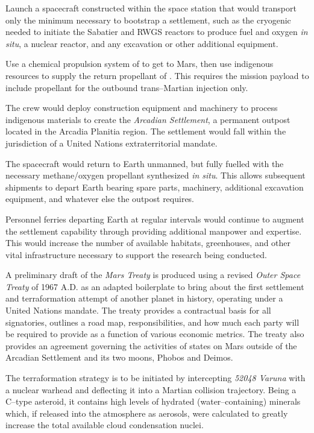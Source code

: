 \item Launch a spacecraft constructed within the space station that would transport only the minimum necessary to bootstrap a settlement, such as the cryogenic  needed to initiate the Sabatier and RWGS reactors to produce fuel and oxygen {\it in situ}, a nuclear reactor, and any excavation or other additional equipment.

\item Use a chemical propulsion system of  to get to Mars, then use indigenous resources to supply the return propellant of . This requires the mission payload to include propellant for the outbound trans--Martian injection only.

\item The crew would deploy construction equipment and machinery to process indigenous materials to create the {\it Arcadian Settlement}, a permanent outpost located in the Arcadia Planitia region. The settlement would fall within the jurisdiction of a United Nations extraterritorial mandate.

\item The spacecraft would return to Earth unmanned, but fully fuelled with the necessary methane/oxygen propellant synthesized {\it in situ}. This allows subsequent shipments to depart Earth bearing spare parts, machinery, additional excavation equipment, and whatever else the outpost requires.

\item Personnel ferries departing Earth at regular intervals would continue to augment the settlement capability through providing additional manpower and expertise. This would increase the number of available habitats, greenhouses, and other vital infrastructure necessary to support the research being conducted.
\stopitemize

A preliminary draft of the {\it Mars Treaty} is produced using a revised {\it Outer Space Treaty} of 1967 A.D. as an adapted boilerplate to bring about the first settlement and terraformation attempt of another planet in history, operating under a United Nations mandate. The treaty provides a contractual basis for all signatories, outlines a road map, responsibilities, and how much each party will be required to provide as a function of various economic metrics. The treaty also provides an agreement governing the activities of states on Mars outside of the Arcadian Settlement and its two moons, Phobos and Deimos.

The terraformation strategy is to be initiated by intercepting {\it 52048 Varuna} with a nuclear warhead and deflecting it into a Martian collision trajectory. Being a C--type asteroid, it contains high levels of hydrated (water--containing) minerals which, if released into the atmosphere as aerosols, were calculated to greatly increase the total available cloud condensation nuclei.

